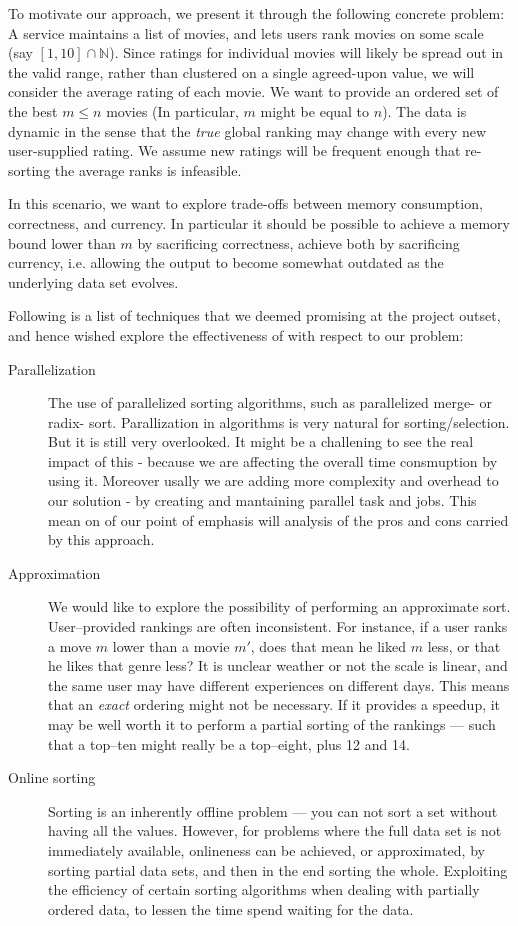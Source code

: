 \documentclass[a4paper, titlepage]{report}
\renewcommand{\%}{\scalebox{.9}{\oldpct}}
\begin{document}
To motivate our approach, we present it through the following concrete problem:
A service maintains a list of movies, and lets users rank movies on some scale
(say $\left[1,10\right]\cap \mathbb{N}$). Since ratings for individual movies
will likely be spread out in the valid range, rather than clustered on a single
agreed-upon value, we will consider the average rating of each movie. We want to
provide an ordered set of the best $m\leq n$ movies (In particular, $m$ might be
equal to $n$).
The data is dynamic in the sense that the \textit{true} global ranking may
change with every new user-supplied rating. We assume new ratings will be
frequent enough that re-sorting the average ranks is infeasible.

In this scenario, we want to explore trade-offs between memory
consumption, correctness, and  currency. In particular it should be possible to
achieve a memory bound lower than $m$ by sacrificing correctness, achieve both
by sacrificing currency, i.e. allowing the output to become somewhat outdated as
the underlying data set evolves.

Following is a list of techniques that we deemed promising at the project
outset, and hence wished explore the effectiveness of with respect to our
problem:

\begin{description}
	\item[Parallelization] The use of parallelized sorting algorithms, such
		as parallelized merge- or radix- sort. Parallization in algorithms is very
		natural for sorting/selection. But it is still very overlooked. It might be
		a challening to see the real impact of this - because we are affecting the
		overall time consmuption by using it. Moreover usally we are adding more
		complexity and overhead to our solution - by creating and mantaining parallel
		task and jobs. This mean on of our point of emphasis will analysis of the
		pros and cons carried by this approach.
	\item[Approximation] We would like to explore the possibility of
		performing an approximate sort. User--provided rankings are
		often inconsistent. For instance, if a user ranks a move $m$
		lower than a movie $m'$, does that mean he liked $m$ less, or
		that he likes that genre less? It is unclear weather or not the
		scale is linear, and the same user may have different
		experiences on different days. This means that an \textit{exact}
		ordering might not be necessary. If it provides a speedup, it
		may be well worth it to perform a partial sorting of the
		rankings --- such that a top--ten might really be a top--eight,
		plus 12 and 14.
	\item[Online sorting] Sorting is an inherently offline problem --- you
		can not sort a set without having all the values. However, for
		problems where the full data set is not immediately available,
		onlineness can be achieved, or approximated, by sorting partial
		data sets, and then in the end sorting the whole. Exploiting the
		efficiency of certain sorting algorithms when dealing with
		partially ordered data, to lessen the time spend waiting for the
		data.

\end{description}




\end{document}
